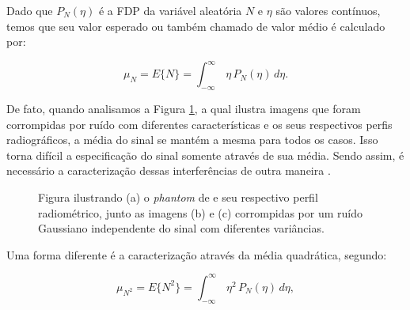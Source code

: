 Dado que $P_{N}(\eta)$ é a \ac{FDP} da variável aleatória $N$ e $\eta$ são valores contínuos, temos que seu valor esperado ou também chamado de valor médio é calculado por:


\begin{equation}
\mu_{N} = E\{N\}= {\int_{-\infty}^{\infty} \,\eta \, P_{N}(\eta) \, d\eta}.
\label{eq:eqCapRuidoValorEsperado}
\end{equation}

De fato, quando analisamos a Figura \ref{fig:imgCapRuidoPhantom}, a qual ilustra imagens que foram corrompidas por ruído com diferentes características e os seus respectivos perfis radiográficos, a média do sinal se mantém a mesma para todos os casos. Isso torna difícil a especificação do sinal somente através de sua média. Sendo assim, é necessário a caracterização dessas interferências de outra maneira \cite{dougherty2009digital}.

\begin{figure}[H]
	\centering
	
	\caption{Figura ilustrando (a) o \textit{phantom} de  e seu respectivo perfil radiométrico, junto as imagens (b) e (c) corrompidas por um ruído Gaussiano independente do sinal com diferentes variâncias.}
	
	\hfil
	\hfil
	\hfil
	
	\hfil
	\hfil
	
	\label{fig:imgCapRuidoPhantom}
\end{figure}

Uma forma diferente é a caracterização através da média quadrática, segundo:
   
\begin{equation}
\mu_{N^{2}} = E\{N^{2}\}= {\int_{-\infty}^{\infty} \,\eta^{2} \, P_{N}(\eta) \, d\eta},
\label{eq:eqCapRuidoEsperacaQuadratica}
\end{equation}

